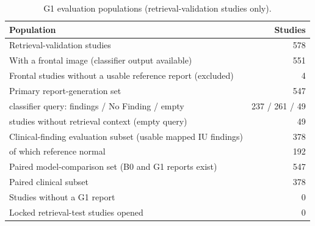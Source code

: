 \begin{table}[t]
\centering
\scriptsize
\begin{tabular}{lr}
\hline
Population & Studies \\
\hline
Retrieval-validation studies & 578 \\
With a frontal image (classifier output available) & 551 \\
Frontal studies without a usable reference report (excluded) & 4 \\
Primary report-generation set & 547 \\
  classifier query: findings / No Finding / empty & 237 / 261 / 49 \\
  studies without retrieval context (empty query) & 49 \\
Clinical-finding evaluation subset (usable mapped IU findings) & 378 \\
  of which reference normal & 192 \\
Paired model-comparison set (B0 and G1 reports exist) & 547 \\
Paired clinical subset & 378 \\
Studies without a G1 report & 0 \\
Locked retrieval-test studies opened & 0 \\
\hline
\end{tabular}
\caption{G1 evaluation populations (retrieval-validation studies only).}
\label{tab:table1_evaluation_population}
\end{table}
